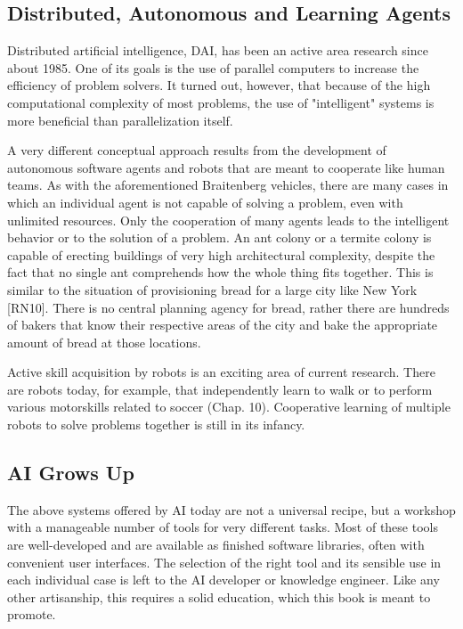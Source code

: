 \documentclass[10pt]{book}
\begin{document}
\subsection{Distributed, Autonomous and Learning Agents}
Distributed artificial intelligence, DAI, has been an active area research since about 1985. One of its goals is the use of parallel computers to increase the efficiency of problem solvers. It turned out, however, that because of the high computational complexity of most problems, the use of "intelligent" systems is more beneficial than parallelization itself.

A very different conceptual approach results from the development of autonomous software agents and robots that are meant to cooperate like human teams. As with the aforementioned Braitenberg vehicles, there are many cases in which an individual agent is not capable of solving a problem, even with unlimited resources. Only the cooperation of many agents leads to the intelligent behavior or to the solution of a problem. An ant colony or a termite colony is capable of erecting buildings of very high architectural complexity, despite the fact that no single ant comprehends how the whole thing fits together. This is similar to the situation of provisioning bread for a large city like New York [RN10]. There is no central planning agency for bread, rather there are hundreds of bakers that know their respective areas of the city and bake the appropriate amount of bread at those locations.

Active skill acquisition by robots is an exciting area of current research. There are robots today, for example, that independently learn to walk or to perform various motorskills related to soccer (Chap. 10). Cooperative learning of multiple robots to solve problems together is still in its infancy.
\subsection{AI Grows Up}
The above systems offered by AI today are not a universal recipe, but a workshop with a manageable number of tools for very different tasks. Most of these tools are well-developed and are available as finished software libraries, often with convenient user interfaces. The selection of the right tool and its sensible use in each individual case is left to the AI developer or knowledge engineer. Like any other artisanship, this requires a solid education, which this book is meant to promote.
\end{document}

